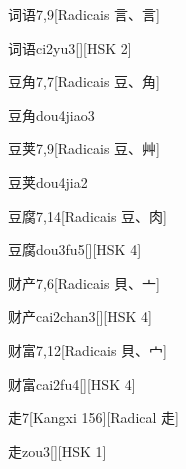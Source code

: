 \begin{entry}{词语}{7,9}[Radicais ⾔、⾔]
  \begin{phonetics}{词语}{ci2yu3}[][HSK 2]
  \end{phonetics}
\end{entry}

\begin{entry}{豆角}{7,7}[Radicais ⾖、⾓]
  \begin{phonetics}{豆角}{dou4jiao3}
  \end{phonetics}
\end{entry}

\begin{entry}{豆荚}{7,9}[Radicais ⾖、⾋]
  \begin{phonetics}{豆荚}{dou4jia2}
  \end{phonetics}
\end{entry}

\begin{entry}{豆腐}{7,14}[Radicais ⾖、⾁]
  \begin{phonetics}{豆腐}{dou3fu5}[][HSK 4]
  \end{phonetics}
\end{entry}

\begin{entry}{财产}{7,6}[Radicais ⾙、⼇]
  \begin{phonetics}{财产}{cai2chan3}[][HSK 4]
  \end{phonetics}
\end{entry}

\begin{entry}{财富}{7,12}[Radicais ⾙、⼧]
  \begin{phonetics}{财富}{cai2fu4}[][HSK 4]
  \end{phonetics}
\end{entry}

\begin{entry}{走}{7}[Kangxi 156][Radical ⾛]
  \begin{phonetics}{走}{zou3}[][HSK 1]
  \end{phonetics}
\end{entry}

